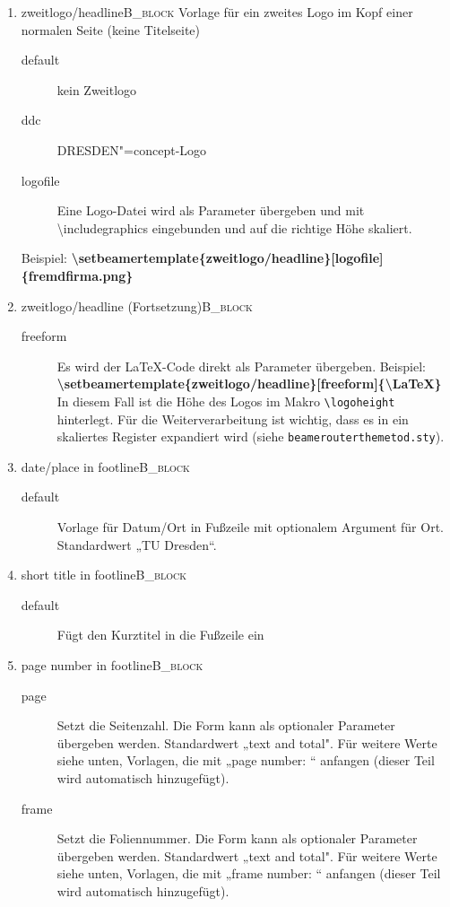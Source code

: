\documentclass[presentation,t]{beamer}
\begin{document}
\begin{enumerate}
\item zweitlogo/headline\hfill{}\textsc{B\_block}
\label{sec:org31ddcb7}
Vorlage für ein zweites Logo im Kopf einer normalen Seite (keine Titelseite)
\begin{description}
\item[{default}] kein Zweitlogo
\item[{ddc}] DRESDEN"=concept-Logo
\item[{logofile}] Eine Logo-Datei wird als Parameter übergeben und mit
\textbackslash includegraphics eingebunden und auf die
richtige Höhe skaliert.
\end{description}
Beispiel: 
\textbf{\textbackslash setbeamertemplate\{zweitlogo/headline\}[logofile]\{fremdfirma.png\}}
\item zweitlogo/headline (Fortsetzung)\hfill{}\textsc{B\_block}
\label{sec:orgbbb2df6}
\begin{description}
\item[{freeform}] Es wird der \LaTeX -Code direkt als Parameter übergeben. Beispiel:
\textbf{\textbackslash setbeamertemplate\{zweitlogo/headline\}[freeform]\{\textbackslash LaTeX\}}
In diesem Fall ist die Höhe des Logos im Makro
\texttt{\textbackslash logoheight} hinterlegt. Für die
Weiterverarbeitung ist wichtig, dass es in ein
skaliertes Register expandiert wird (siehe
\texttt{beamerouterthemetod.sty}).
\end{description}

\item date/place in footline\hfill{}\textsc{B\_block}
\label{sec:org9452fa8}
\begin{description}
\item[{default}] Vorlage für Datum/Ort in Fußzeile mit optionalem Argument
für Ort. Standardwert „TU Dresden“.
\end{description}

\item short title in footline\hfill{}\textsc{B\_block}
\label{sec:org7089dea}
\begin{description}
\item[{default}] Fügt den Kurztitel in die Fußzeile ein
\end{description}

\item page number in footline\hfill{}\textsc{B\_block}
\label{sec:org03ef019}
\small
\begin{description}
\item[{page}] Setzt die Seitenzahl. Die Form kann als optionaler Parameter
übergeben werden. Standardwert „text and total". Für weitere Werte
siehe unten, Vorlagen, die mit „page number: “ anfangen (dieser Teil
wird automatisch hinzugefügt).
\item[{frame}] Setzt die Foliennummer. Die Form kann als optionaler Parameter
übergeben werden. Standardwert „text and total". Für weitere Werte
siehe unten, Vorlagen, die mit „frame number: “ anfangen (dieser Teil
wird automatisch hinzugefügt).
\end{description}


\end{enumerate}
\end{document}
